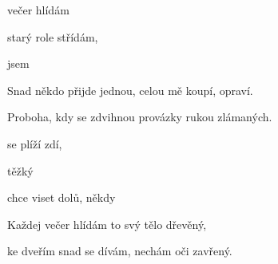 
\zs
{} večer hlídám
  

 starý role střídám,
   
\ks

\zr
{}   jsem 

   

  
\kr


\zs
Snad někdo přijde jednou,
celou mě koupí, opraví.

Proboha, kdy se zdvihnou
provázky rukou zlámaných.
\ks

\zr
\kr

\zs
{} se plíží  zdí,

 těžký 

 chce viset  dolů,
 někdy 
\ks

\zs
Každej večer hlídám
to svý tělo dřevěný,

ke dveřím snad se dívám,
nechám oči zavřený.
\ks


\zr \kr
\kp


